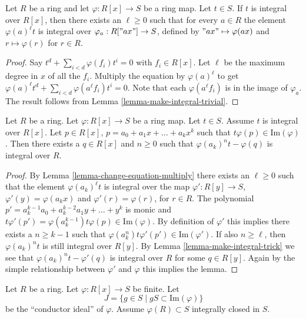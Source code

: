 \begin{lemma}
\label{lemma-change-equation-multiply}
Let $R$ be a ring and let $\varphi : R[x] \to S$ be
a ring map. Let $t \in S$. If $t$ is integral over
$R[x]$, then there exists an $\ell \geq 0$ such that
for every $a \in R$ the element $\varphi(a)^\ell t$
is integral over $\varphi_a : R["ax"] \to S$, defined by
$"ax" \mapsto \varphi(ax)$ and $r \mapsto \varphi(r)$
for $r\in R$.
\end{lemma}

\begin{proof}
Say $t^d + \sum_{i<d} \varphi(f_i)t^i = 0$
with $f_i \in R[x]$. Let $\ell$ be the maximum degree
in $x$ of all the $f_i$. Multiply the equation
by $\varphi(a)^\ell$ to get
$\varphi(a)^\ell t^d + \sum_{i<d} \varphi(a^\ell f_i)t^i = 0$.
Note that each $\varphi(a^\ell f_i)$ is in the image of
$\varphi_a$. The result follows from
Lemma \ref{lemma-make-integral-trivial}.
\end{proof}

\begin{lemma}
\label{lemma-combine-lemmas}
Let $R$ be a ring. Let $\varphi : R[x] \to S$ be
a ring map. Let $t \in S$. Assume $t$ is integral
over $R[x]$. Let $p \in R[x]$, $p = a_0 + a_1x + \ldots +
a_k x^k$ such that $t \varphi(p) \in \text{Im}(\varphi)$.
Then there exists a $q \in R[x]$ and $n \geq 0$
such that $\varphi(a_k)^n t - \varphi(q) $ is integral
over $R$.
\end{lemma}

\begin{proof}
By Lemma \ref{lemma-change-equation-multiply} there exists
an $\ell \geq 0$ such that
the element $\varphi(a_k)^\ell t$ is integral
over the map $\varphi' : R[y] \to S$, $\varphi'(y) = 
\varphi(a_k x)$ and $\varphi'(r) = \varphi(r)$, for $r\in R$.
The polynomial $p' = a_k^{k-1} a_0 + a_k^{k-2} a_1 y
+ \ldots + y^k$ is monic and $t \varphi'(p')
= \varphi(a_k^{k-1}) t \varphi(p) \in \text{Im}(\varphi)$.
By definition of $\varphi'$ this implies there exists
a $n \geq k-1$ such that $\varphi(a_k^n)t \varphi'(p')
\in \text{Im}(\varphi')$. If also $n \geq \ell$, then
$\varphi(a_k)^n t$ is still integral over $R[y]$.
By Lemma \ref{lemma-make-integral-trick} 
we see that $\varphi(a_k)^n t - \varphi'(q)$ is integral over $R$
for some $q \in R[y]$. Again by the simple relationship between
$\varphi'$ and $\varphi$ this implies the lemma.
\end{proof}

\begin{situation}
\label{situation-one-transcendental-element}
Let $R$ be a ring.
Let $\varphi : R[x] \to S$ be finite.
Let
$$
J = \{ g \in S \mid gS \subset \text{Im}(\varphi)\}
$$
be the ``conductor ideal'' of $\varphi$.
Assume $\varphi(R) \subset S$ integrally closed in $S$.
\end{situation}

